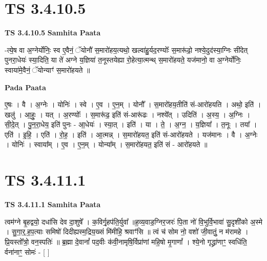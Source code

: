 \documentclass[17pt]{extarticle}
\begin{document}

\section{ TS 3.4.10.5 }

\textbf{TS 3.4.10.5 } \newline
\textbf{Samhita Paata} \newline

-त्ये॒ष वा अ॒ग्नेर्योनिः॒ स्व ए॒वैनं॒ ॅयोनौ॑ स॒मारो॑हय॒त्यथो॒ खल्वा॑हु॒र्यद॒रण्योः᳚ स॒मारू॑ढो॒ नश्ये॒दुद॑स्या॒ग्निः सी॑देत् पुनरा॒धेयः॑ स्या॒दिति॒ या ते॑ अग्ने य॒ज्ञिया॑ त॒नूस्तयेह्या रो॒हेत्या॒त्मन्थ् स॒मारो॑हयते॒ यज॑मानो॒ वा अ॒ग्नेर्योनिः॒ स्वाया॑मे॒वैनं॒ ॅयोन्याꣳ॑ स॒मारो॑हयते ॥ \newline

\textbf{Pada Paata} \newline

ए॒षः । वै । अ॒ग्नेः । योनिः॑ । स्वे । ए॒व । ए॒न॒म् । योनौ᳚ । स॒मारो॑हय॒तीति॑ सं-आरो॑हयति । अथो॒ इति॑ । खलु॑ । आ॒हुः॒ । यत् । अ॒रण्योः᳚ । स॒मारू॑ढ॒ इति॑ सं-आरू॑ढः । नश्ये᳚त् । उदिति॑ । अ॒स्य॒ । अ॒ग्निः । सी॒दे॒त् । पु॒न॒रा॒धेय॒ इति॑ पुनः - आ॒धेयः॑ । स्या॒त् । इति॑ । या । ते॒ । अ॒ग्न॒ । य॒ज्ञिया᳚ । त॒नूः । तया᳚ । एति॑ । इ॒हि॒ । एति॑ । रो॒ह॒ । इति॑ । आ॒त्मन्न् । स॒मारो॑हयत॒ इति॑ सं-आरो॑हयते । यज॑मानः । वै । अ॒ग्नेः । योनिः॑ । स्वाया᳚म् । ए॒व । ए॒न॒म् । योन्या᳚म् । स॒मारो॑हयत॒ इति॑ सं - आरो॑हयते ॥  \newline





\section{ TS 3.4.11.1 }

\textbf{TS 3.4.11.1 } \newline
\textbf{Samhita Paata} \newline

त्वम॑ग्ने बृ॒हद्वयो॒ दधा॑सि देव दा॒शुषे᳚ । क॒विर्गृ॒हप॑ति॒र्युवा᳚ ॥ह॒व्य॒वाड॒ग्निर॒जरः॑ पि॒ता नो॑ वि॒भुर्वि॒भावा॑ सु॒दृशी॑को अ॒स्मे । सु॒गा॒र्॒.ह॒प॒त्याः समिषो॑ दिदीह्यस्म॒द्रिय॒ख्सं मि॑मीहि॒ श्रवाꣳ॑सि ॥ त्वं च॑ सोम नो॒ वशो॑ जी॒वातुं॒ न म॑रामहे । प्रि॒यस्तो᳚त्रो॒ वन॒स्पतिः॑ ॥ ब्र॒ह्मा दे॒वानां᳚ पद॒वीः क॑वी॒नामृषि॒र्विप्रा॑णां महि॒षो मृ॒गाणां᳚ । श्ये॒नो गृद्ध्रा॑णाꣳ॒॒ स्वधि॑ति॒ र्वना॑नाꣳ॒॒ सोमः॑ - [  ] \newline
\end{document}
